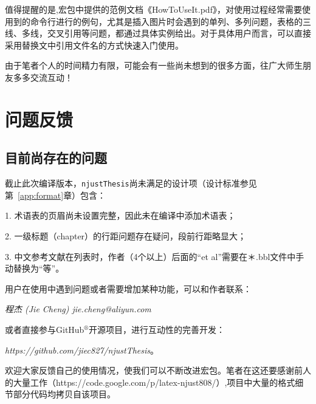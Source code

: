 值得提醒的是,宏包中提供的范例文档《HowToUseIt.pdf》，对使用过程经常需要使用到的命令行进行的例句，尤其是插入图片时会遇到的单列、多列问题，表格的三线、多线，交叉引用等问题，都通过具体实例给出。对于具体用户而言，可以直接采用替换文中引用文件名的方式快速入门使用。

由于笔者个人的时间精力有限，可能会有一些尚未想到的很多方面，往广大师生朋友多多交流互动！

\section{问题反馈}
\label{sec:FandQ}

\subsection{目前尚存在的问题}
\label{sec:remainingProblem}
截止此次编译版本，\texttt{njustThesis}尚未满足的设计项（设计标准参见第~\ref{app:format}章）包含：

1. 术语表的页眉尚未设置完整，因此未在编译中添加术语表；

2. 一级标题（chapter）的行距问题存在疑问，段前行距略显大；

3. 中文参考文献在列表时，作者（4个以上）后面的“et al”需要在＊.bbl文件中手动替换为“等”。


用户在使用中遇到问题或者需要增加某种功能，可以和作者联系：

{\it{程杰 (Jie Cheng) \quad jie.cheng@aliyun.com}}

或者直接参与GitHub$^{\circledR}$开源项目，进行互动性的完善开发：

{\it{https://github.com/jiec827/njustThesis}}。

欢迎大家反馈自己的使用情况，使我们可以不断改进宏包。笔者在这还要感谢前人的大量工作（https://code.google.com/p/latex-njust808/）,项目中大量的格式细节部分代码均拷贝自该项目。
